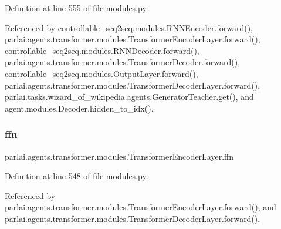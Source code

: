 Definition at line 555 of file modules.\+py.



Referenced by controllable\+\_\+seq2seq.\+modules.\+R\+N\+N\+Encoder.\+forward(), parlai.\+agents.\+transformer.\+modules.\+Transformer\+Encoder\+Layer.\+forward(), controllable\+\_\+seq2seq.\+modules.\+R\+N\+N\+Decoder.\+forward(), parlai.\+agents.\+transformer.\+modules.\+Transformer\+Decoder.\+forward(), controllable\+\_\+seq2seq.\+modules.\+Output\+Layer.\+forward(), parlai.\+agents.\+transformer.\+modules.\+Transformer\+Decoder\+Layer.\+forward(), parlai.\+tasks.\+wizard\+\_\+of\+\_\+wikipedia.\+agents.\+Generator\+Teacher.\+get(), and agent.\+modules.\+Decoder.\+hidden\+\_\+to\+\_\+idx().

\mbox{\label{classparlai_1_1agents_1_1transformer_1_1modules_1_1TransformerEncoderLayer_a2f40ac67a332293a3f51eb11647e2ec1}} 
\subsubsection{\texorpdfstring{ffn}{ffn}}
{\footnotesize\ttfamily parlai.\+agents.\+transformer.\+modules.\+Transformer\+Encoder\+Layer.\+ffn}



Definition at line 548 of file modules.\+py.



Referenced by parlai.\+agents.\+transformer.\+modules.\+Transformer\+Encoder\+Layer.\+forward(), and parlai.\+agents.\+transformer.\+modules.\+Transformer\+Decoder\+Layer.\+forward().

\mbox{\label{classparlai_1_1agents_1_1transformer_1_1modules_1_1TransformerEncoderLayer_abcdb8b9abb049afacdd132d2a811faff}} 
